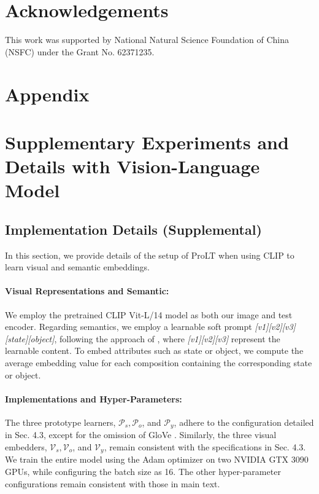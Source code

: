 \documentclass[letterpaper]{article} %
\theoremstyle{definition}
\begin{document}
\section*{Acknowledgements}
This work was supported by National Natural Science Foundation of
China (NSFC) under the Grant No. 62371235.

\clearpage


\clearpage
\noindent \section{Appendix}
\renewcommand\thefigure{A.\arabic{figure}}
\renewcommand\theequation{A.\arabic{equation}}
\renewcommand\thetable{A.\arabic{table}}

\section{Supplementary Experiments and Details with Vision-Language Model}
\subsection{Implementation Details (Supplemental)}
In this section, we provide details of the setup of ProLT when using CLIP to learn visual and semantic embeddings.

\paragraph{Visual Representations and Semantic:} We employ the pretrained CLIP Vit-L/14 model as both our image and test encoder. Regarding semantics, we employ a learnable soft prompt \textit{[v1][v2][v3][state][object]}, following the approach of \citet{dfsp}, where \textit{[v1][v2][v3]} represent the learnable content. To embed attributes such as state or object, we compute the average embedding value for each composition containing the corresponding state or object.

\paragraph{Implementations and Hyper-Parameters: }The three prototype learners, $\mathcal{P}_{s},\mathcal{P}_{o}$, and $\mathcal{P}_{y}$, adhere to the configuration detailed in Sec. 4.3, except for the omission of GloVe \cite{glove}. Similarly, the three visual embedders, $\mathcal{V}_{s},\mathcal{V}_{o}$, and $\mathcal{V}_{y}$, remain consistent with the specifications in Sec. 4.3. We train the entire model using the Adam optimizer \cite{kingma2014adam} on two NVIDIA GTX 3090 GPUs, while configuring the batch size as 16. The other hyper-parameter configurations remain consistent with those in main text.
\end{document}
